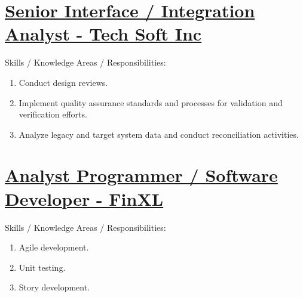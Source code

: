 \documentclass{article}
\begin{document}
\section*{\href{https://www.indeed.com/viewjob?jk=421d1076f2b6fabc&tk=1imgqk0jr2aft07q&from=serp&vjs=3}{Senior Interface / Integration Analyst - Tech Soft Inc}}
Skills / Knowledge Areas / Responsibilities:
\begin{enumerate}
  \item Conduct design reviews.
  \item Implement quality assurance standards and processes for validation and verification efforts.
  \item Analyze legacy and target system data and conduct reconciliation activities.
\end{enumerate}
\section*{\href{https://www.seek.com.au/job/82762585}{Analyst Programmer / Software Developer - FinXL}}
Skills / Knowledge Areas / Responsibilities:
\begin{enumerate}
  \item Agile development.
  \item Unit testing.
  \item Story development.
\end{enumerate}
\end{document}
